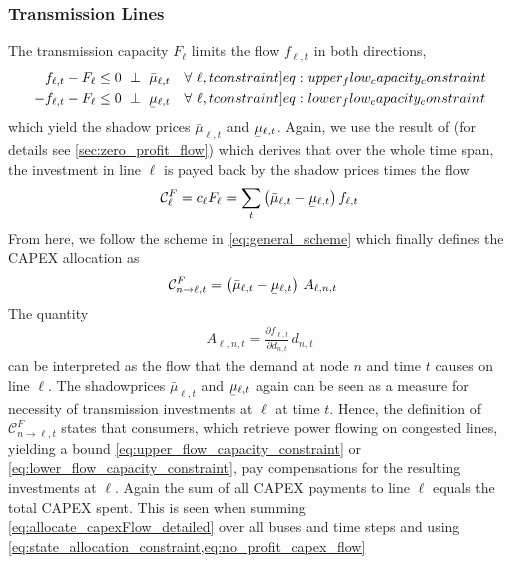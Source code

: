 \documentclass[11pt,twocolumn]{article}
\newcommand{\ubar}[1]{\underaccent{\bar}{#1}}
\newcommand{\resultsin}[1]{\hspace{6pt} \bot  \hspace{6pt} #1}
\newcommand{\Forall}[1]{\hspace{10pt} \forall \,\, #1 }
\newcommand{\pdv}[2]{\frac{\partial #1}{\partial #2}}
\newcommand{\flow}{f_{\ell,t}}
\newcommand{\capacityflow}{F_{\ell}}
\newcommand{\capitalpriceflow}{c_{\ell}}
\newcommand{\mulowerflow}{\ubar{\mu}_{\ell,t}}
\newcommand{\muupperflow}{\bar{\mu}_{\ell,t}}
\newcommand{\demand}[1][n]{d_{#1,t}}
\newcommand{\capexflow}{\mathcal{C}^F}
\newcommand{\allocateflow}[1][n]{A_{\ell,#1,t}}
\newcommand{\allocatecapexflow}[1][n \rightarrow \ell]{\capexflow_{#1,t}}
\begin{document}
\subsubsection{Transmission Lines}

The transmission capacity $\capacityflow$ limits the flow $\flow$ in both directions,
\begin{align}
\flow - \capacityflow &\le 0 \resultsin{\muupperflow} \Forall{\ell,t} 
\label[constraint]{eq:upper_flow_capacity_constraint} \\
- \flow - \capacityflow &\le 0 \resultsin{\mulowerflow} \Forall{\ell,t} 
\label[constraint]{eq:lower_flow_capacity_constraint}
\end{align}
which yield the shadow prices $\muupperflow$ and $\mulowerflow$. Again, we use the result of \cite{brown_decreasing_2020} (for details see \cref{sec:zero_profit_flow}) which derives that over the whole time span, the investment in line $\ell$ is payed back by the shadow prices times the flow 
\begin{align}
\capexflow_\ell = \capitalpriceflow \capacityflow = \sum_{t} \left( \muupperflow - \mulowerflow \right)  \flow 
\label{eq:no_profit_capex_flow}
\end{align}
From here, we follow the scheme in \cref{eq:general_scheme} which finally defines the CAPEX allocation as 
\begin{align}
    \allocatecapexflow &=  
   \left( \muupperflow - \mulowerflow\right) \, \allocateflow
   \label{eq:allocate_capexFlow_detailed}
\end{align}
The quantity 
\begin{align}
 \allocateflow =  \pdv{\flow}{\demand}\, \demand
\end{align}
can be interpreted as the flow that the demand at node $n$ and time $t$ causes on line $\ell$.
The  shadowprices $\muupperflow$ and $\mulowerflow$ again can be seen as a measure for necessity of transmission investments at $\ell$ at time $t$. Hence, the definition of $\allocatecapexflow$ states that consumers, which retrieve power flowing on congested lines, yielding a bound \cref{eq:upper_flow_capacity_constraint} or \eqref{eq:lower_flow_capacity_constraint}, pay compensations for the resulting investments at $\ell$. Again the sum of all CAPEX payments to line $\ell$ equals the total CAPEX spent. This is seen when summing \cref{eq:allocate_capexFlow_detailed} over all buses and time steps and using \cref{eq:state_allocation_constraint,eq:no_profit_capex_flow}
\end{document}
